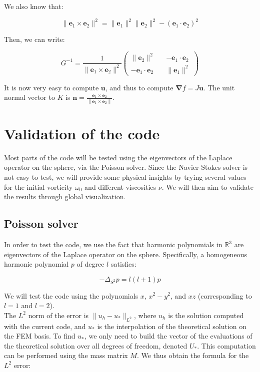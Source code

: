 \documentclass{article}
\theoremstyle{definition}
\theoremstyle{proposition}
\theoremstyle{theorem}
\theoremstyle{remark}
\theoremstyle{corollary}  %
\theoremstyle{exercise}
\theoremstyle{lemma}
\begin{document}
We also know that: 

$$\|\bm e_1 \times \bm e_2\|^2 = \|\bm e_1\|^2\|\bm e_2\|^2 - (\bm e_1 \cdot \bm e_2)^2$$

Then, we can write: 

$$G^{-1} = \frac{1}{\|\bm e_1 \times \bm e_2\|^2} 
\begin{pmatrix}
    \|\bm e_2\|^2 && -\bm e_1 \cdot \bm e_2 \\ 
    -\bm e_1 \cdot \bm e_2 && \|\bm e_1\|^2
\end{pmatrix}$$


It is now very easy to compute $\bm u$, and thus to compute $\bm \nabla f = J \bm u$. The unit normal vector to $K$ is $\bm n = \frac{\bm e_1 \times \bm e_2}{\|\bm e_1 \times \bm e_2\|}$.


\section{Validation of the code}

Most parts of the code will be tested using the eigenvectors of the Laplace operator on the sphere, via the Poisson solver. Since the Navier-Stokes solver is not easy to test, we will provide some physical insights by trying several values for the initial vorticity $\omega_0$ and different viscosities $\nu$. We will then aim to validate the results through global visualization.

\subsection{Poisson solver}

In order to test the code, we use the fact that harmonic polynomials in $\mathbb{R}^3$ are eigenvectors of the Laplace operator on the sphere. Specifically, a homogeneous harmonic polynomial $p$ of degree $l$ satisfies: 

$$-\Delta_{S^{2}}p = l(l+1) p$$

We will test the code using the polynomials $x$, $x^2 - y^2$, and $xz$ (corresponding to $l = 1$ and $l = 2$). \\

The $L^2$ norm of the error is $\|u_h - u_*\|_{L^2}$, where $u_h$ is the solution computed with the current code, and $u_*$ is the interpolation of the theoretical solution on the FEM basis. To find $u_*$, we only need to build the vector of the evaluations of the theoretical solution over all degrees of freedom, denoted $U_*$. This computation can be performed using the mass matrix $M$. We thus obtain the formula for the $L^2$ error: 
\end{document}
